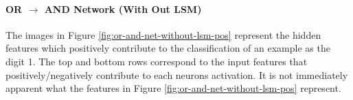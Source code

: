 \noindent
\begin{minipage}[t]{0.35\textwidth}
	\vspace{0px}
\paragraph{OR $\rightarrow$ AND Network (With Out LSM)}
The images in Figure \ref{fig:or-and-net-without-lsm-pos} represent the hidden features which positively contribute to the classification of an example as the digit 1. The top and bottom rows correspond to the input features that positively/negatively contribute to each neurons activation. It is not immediately apparent what the features in Figure \ref{fig:or-and-net-without-lsm-pos} represent.\\
\end{minipage}
\hspace{0.05\textwidth}

